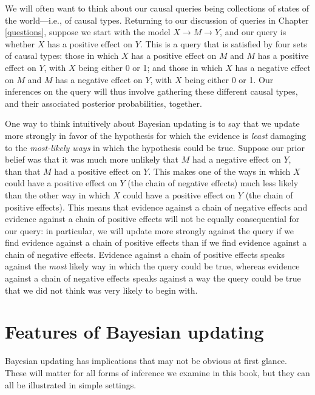 \documentclass[
  12pt,
]{book}
\begin{document}
We will often want to think about our causal queries being collections of states of the world---i.e., of causal types. Returning to our discussion of queries in Chapter \ref{questions}, suppose we start with the model \(X \rightarrow M \rightarrow Y\), and our query is whether \(X\) has a positive effect on \(Y\). This is a query that is satisfied by four sets of causal types: those in which \(X\) has a positive effect on \(M\) and \(M\) has a positive effect on \(Y\), with \(X\) being either 0 or 1; and those in which \(X\) has a negative effect on \(M\) and \(M\) has a negative effect on \(Y\), with \(X\) being either 0 or 1. Our inferences on the query will thus involve gathering these different causal types, and their associated posterior probabilities, together.

One way to think intuitively about Bayesian updating is to say that we update more strongly in favor of the hypothesis for which the evidence is \emph{least} damaging to the \emph{most-likely ways} in which the hypothesis could be true. Suppose our prior belief was that it was much more unlikely that \(M\) had a negative effect on \(Y\), than that \(M\) had a positive effect on \(Y\). This makes one of the ways in which \(X\) could have a positive effect on \(Y\) (the chain of negative effects) much less likely than the other way in which \(X\) could have a positive effect on \(Y\) (the chain of positive effects). This means that evidence against a chain of negative effects and evidence against a chain of positive effects will not be equally consequential for our query: in particular, we will update more strongly against the query if we find evidence against a chain of positive effects than if we find evidence against a chain of negative effects. Evidence against a chain of positive effects speaks against the \emph{most} likely way in which the query could be true, whereas evidence against a chain of negative effects speaks against a way the query could be true that we did not think was very likely to begin with.

\hypertarget{features-of-bayesian-updating}{%
\section{Features of Bayesian updating}\label{features-of-bayesian-updating}}

Bayesian updating has implications that may not be obvious at first glance. These will matter for all forms of inference we examine in this book, but they can all be illustrated in simple settings.
\end{document}
